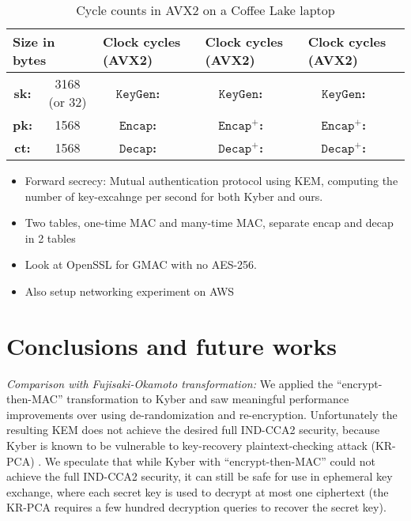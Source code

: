 \documentclass[floatrow,journal=tches,submission]{iacrtrans}
\newcommand{\keygen}{\texttt{KeyGen}}
\newcommand{\encap}{\texttt{Encap}}
\newcommand{\decap}{\texttt{Decap}}
\begin{document}
\begin{table}[h]
\begin{tabular}{|c|c||c|c| |c|c| |c|c|}
\multicolumn{2}{|l|}{Size in bytes} & \multicolumn{2}{|l|}{Clock cycles (AVX2)} & \multicolumn{2}{|l|}{Clock cycles (AVX2)} & \multicolumn{2}{|l|}{Clock cycles (AVX2)} \\ \hline 
{\bf sk:} & 3168 (or 32) & {\bf $\keygen$:} & & {\bf $\keygen$:} & & {\bf $\keygen$:} & \\ \hline 
{\bf pk:} & 1568 & {\bf $\encap$:} & & {\bf $\encap^+$:} & & {\bf $\encap^+$:} & \\ \hline 
{\bf ct:} & 1568 & {\bf $\decap$:} & & {\bf $\decap^+$:} & & {\bf $\decap^+$:} & \\ \hline 
\end{tabular}
\caption{Cycle counts in AVX2 on a Coffee Lake laptop}
\label{tab:ExpResults}
\end{table}

\begin{itemize}
\item Forward secrecy: Mutual authentication protocol using KEM, computing the number of key-excahnge per second for both Kyber and ours. 
\item Two tables, one-time MAC and many-time MAC, separate encap and decap in 2 tables
\item Look at OpenSSL for GMAC with no AES-256. 
\item Also setup networking experiment on AWS
\end{itemize}

\section{Conclusions and future works}\label{sec:future-works}
\emph{Comparison with Fujisaki-Okamoto transformation:} We applied the ``encrypt-then-MAC'' transformation to Kyber and saw meaningful performance improvements over using de-randomization and re-encryption. Unfortunately the resulting KEM does not achieve the desired full IND-CCA2 security, because Kyber is known to be vulnerable to key-recovery plaintext-checking attack (KR-PCA) \cite{ravi2019generic}\cite{ueno2022curse}. We speculate that while Kyber with ``encrypt-then-MAC'' could not achieve the full IND-CCA2 security, it can still be safe for use in ephemeral key exchange, where each secret key is used to decrypt at most one ciphertext (the KR-PCA requires a few hundred decryption queries to recover the secret key).
\end{document}
